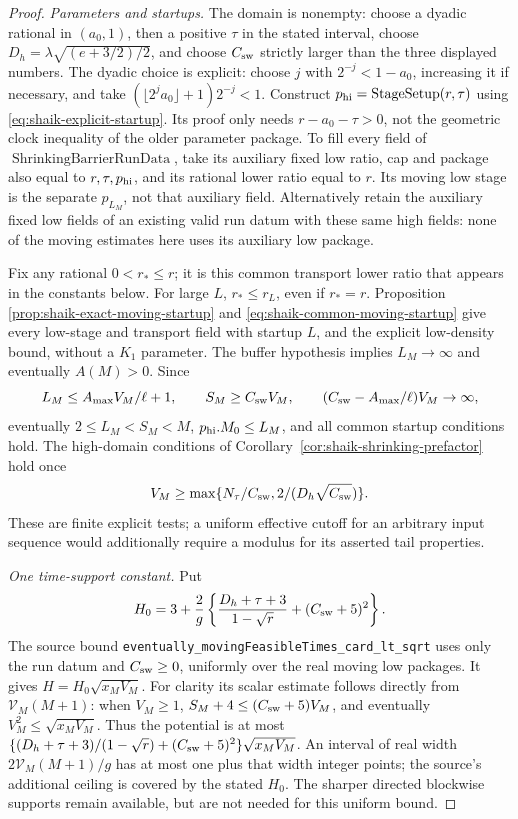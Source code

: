 \documentclass[11pt]{article}
\theoremstyle{remark}\newtheorem{remark}[proposition]{Remark}
\begin{document}
\begin{proof}
\emph{Parameters and startups.}
The domain is nonempty: choose a dyadic rational in \((a_0,1)\),
then a positive \(\tau\) in the stated interval, choose
\(D_h=\lambda\sqrt{(e+3/2)/2}\), and choose \(C_{\rm sw}\) strictly
larger than the three displayed numbers. The dyadic choice is explicit:
choose \(j\) with \(2^{-j}<1-a_0\), increasing it if necessary, and take
\((\lfloor2^ja_0\rfloor+1)2^{-j}<1\).
Construct \(p_{\rm hi}=\operatorname{StageSetup}(r,\tau)\) using
\eqref{eq:shaik-explicit-startup}. Its proof only needs
\(r-a_0-\tau>0\), not the geometric clock inequality of the older
parameter package. To fill every field of
\(\operatorname{ShrinkingBarrierRunData}\), take its auxiliary fixed
low ratio, cap and package also equal to \(r,\tau,p_{\rm hi}\), and
its rational lower ratio equal to \(r\). Its moving low stage is
the separate \(p_{L_M}\), not that auxiliary field.
Alternatively retain the auxiliary fixed low fields of an existing valid
run datum with these same high fields: none of the moving estimates here
uses its auxiliary low package.

Fix any rational \(0<r_*\le r\); it is this common transport lower
ratio that appears in the constants below. For large \(L\),
\(r_*\le r_L\), even if \(r_*=r\). Proposition
\ref{prop:shaik-exact-moving-startup} and
\eqref{eq:shaik-common-moving-startup} give every low-stage and
transport field with startup \(L\), and the explicit low-density
bound, without a \(K_1\) parameter. The buffer hypothesis implies
\(L_M\to\infty\) and eventually \(A(M)>0\). Since
\[
 L_M\le A_{\max}V_M/\ell+1,\qquad
 S_M\ge C_{\rm sw}V_M,\qquad
 (C_{\rm sw}-A_{\max}/\ell)V_M\to\infty,
\]
eventually \(2\le L_M<S_M<M\), \(p_{\rm hi}.M_0\le L_M\), and all
common startup conditions hold. The high-domain conditions of
Corollary~\ref{cor:shaik-shrinking-prefactor} hold once
\[
 V_M\ge\max\{N_\tau/C_{\rm sw},
                     2/(D_h\sqrt{C_{\rm sw}})\}.
\]
These are finite explicit tests; a uniform effective cutoff for an
arbitrary input sequence would additionally require a modulus for
its asserted tail properties.

\emph{One time-support constant.}
Put
\[
 H_0=3+\frac2g\left\{\frac{D_h+\tau+3}{1-\sqrt r}
                                      +(C_{\rm sw}+5)^2\right\}.
\]
The source bound
\texttt{eventually\_movingFeasibleTimes\_card\_lt\_sqrt} uses only
the run datum and \(C_{\rm sw}\ge0\), uniformly over the real
moving low packages. It gives \(H=H_0\sqrt{x_MV_M}\).
For clarity its scalar estimate follows directly from
\(\mathcal V_M(M+1)\): when \(V_M\ge1\),
\(S_M+4\le(C_{\rm sw}+5)V_M\), and eventually
\(V_M^2\le\sqrt{x_MV_M}\).
Thus the potential is at most
\(\{(D_h+\tau+3)/(1-\sqrt r)+(C_{\rm sw}+5)^2\}
\sqrt{x_MV_M}\). An interval of real width
\(2\mathcal V_M(M+1)/g\) has at most one plus that width integer
points; the source's additional ceiling is covered by the stated
\(H_0\). The sharper directed blockwise supports remain available,
but are not needed for this uniform bound.


\end{proof}
\end{document}
